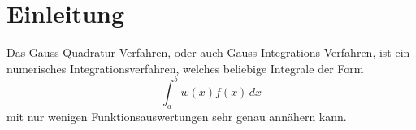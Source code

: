 %
%
%
\section{Einleitung\label{quadratur:section:einleitung}}

Das Gauss-Quadratur-Verfahren, oder auch Gauss-Integrations-Verfahren, ist ein numerisches Integrationsverfahren, welches beliebige Integrale der Form
\begin{equation}
\int_{a}^{b} w(x) f(x)\,dx
\end{equation}
mit nur wenigen Funktionsauswertungen sehr genau annähern kann. 

